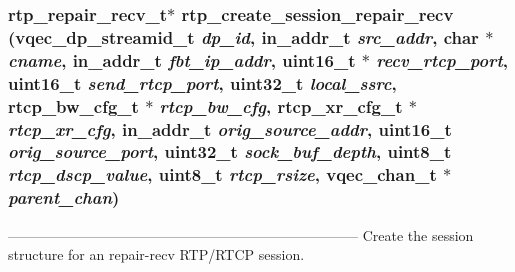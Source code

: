 \subsubsection{\setlength{\rightskip}{0pt plus 5cm}\bf{rtp\_\-repair\_\-recv\_\-t}$\ast$ rtp\_\-create\_\-session\_\-repair\_\-recv (vqec\_\-dp\_\-streamid\_\-t {\em dp\_\-id}, in\_\-addr\_\-t {\em src\_\-addr}, char $\ast$ {\em cname}, in\_\-addr\_\-t {\em fbt\_\-ip\_\-addr}, uint16\_\-t $\ast$ {\em recv\_\-rtcp\_\-port}, uint16\_\-t {\em send\_\-rtcp\_\-port}, uint32\_\-t {\em local\_\-ssrc}, rtcp\_\-bw\_\-cfg\_\-t $\ast$ {\em rtcp\_\-bw\_\-cfg}, rtcp\_\-xr\_\-cfg\_\-t $\ast$ {\em rtcp\_\-xr\_\-cfg}, in\_\-addr\_\-t {\em orig\_\-source\_\-addr}, uint16\_\-t {\em orig\_\-source\_\-port}, uint32\_\-t {\em sock\_\-buf\_\-depth}, uint8\_\-t {\em rtcp\_\-dscp\_\-value}, uint8\_\-t {\em rtcp\_\-rsize}, \bf{vqec\_\-chan\_\-t} $\ast$ {\em parent\_\-chan})}\label{rtp__repair__recv_8c_80abe31ba022a333d4a040a33a69d5db}


--------------------------------------------------------------------------- Create the session structure for an repair-recv RTP/RTCP session.

